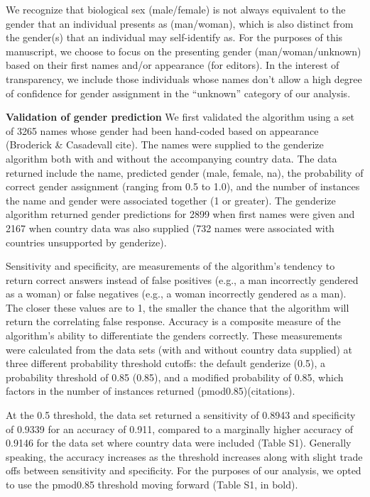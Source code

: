 \documentclass[11pt,]{article}
\begin{document}
We recognize that biological sex (male/female) is not always equivalent
to the gender that an individual presents as (man/woman), which is also
distinct from the gender(s) that an individual may self-identify as. For
the purposes of this manuscript, we choose to focus on the presenting
gender (man/woman/unknown) based on their first names and/or appearance
(for editors). In the interest of transparency, we include those
individuals whose names don't allow a high degree of confidence for
gender assignment in the ``unknown'' category of our analysis.

\textbf{Validation of gender prediction} We first validated the
algorithm using a set of 3265 names whose gender had been hand-coded
based on appearance (Broderick \& Casadevall cite). The names were
supplied to the genderize algorithm both with and without the
accompanying country data. The data returned include the name, predicted
gender (male, female, na), the probability of correct gender assignment
(ranging from 0.5 to 1.0), and the number of instances the name and
gender were associated together (1 or greater). The genderize algorithm
returned gender predictions for 2899 when first names were given and
2167 when country data was also supplied (732 names were associated with
countries unsupported by genderize).

Sensitivity and specificity, are measurements of the algorithm's
tendency to return correct answers instead of false positives (e.g., a
man incorrectly gendered as a woman) or false negatives (e.g., a woman
incorrectly gendered as a man). The closer these values are to 1, the
smaller the chance that the algorithm will return the correlating false
response. Accuracy is a composite measure of the algorithm's ability to
differentiate the genders correctly. These measurements were calculated
from the data sets (with and without country data supplied) at three
different probability threshold cutoffs: the default genderize (0.5), a
probability threshold of 0.85 (0.85), and a modified probability of
0.85, which factors in the number of instances returned
(pmod0.85)(citations).

At the 0.5 threshold, the data set returned a sensitivity of 0.8943 and
specificity of 0.9339 for an accuracy of 0.911, compared to a marginally
higher accuracy of 0.9146 for the data set where country data were
included (Table S1). Generally speaking, the accuracy increases as the
threshold increases along with slight trade offs between sensitivity and
specificity. For the purposes of our analysis, we opted to use the
pmod0.85 threshold moving forward (Table S1, in bold).
\end{document}
